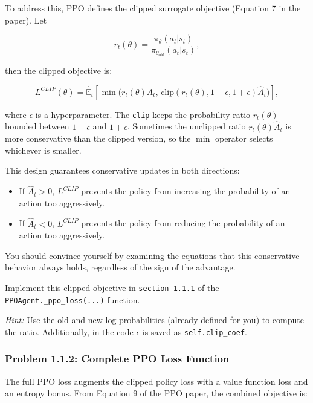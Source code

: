 \documentclass[12pt]{article}
\begin{document}
\noindent
To address this, PPO defines the clipped surrogate objective (Equation 7 in the paper). Let

\begin{equation}
r_t(\theta) = \frac{\pi_\theta(a_t|s_t)}{\pi_{\theta_{\text{old}}}(a_t|s_t)},
\end{equation}

then the clipped objective is:

\begin{equation}
L^{CLIP}(\theta) = \hat{\mathbb{E}}_t \left[ \min\!\Big(r_t(\theta) \hat{A}_t, \, \text{clip}(r_t(\theta), 1-\epsilon, 1+\epsilon) \hat{A}_t\Big) \right],
\end{equation}

where $\epsilon$ is a hyperparameter.  The \texttt{clip} keeps the probability ratio $r_t(\theta)$ bounded between $1-\epsilon$ and $1+\epsilon$. Sometimes the unclipped ratio $r_t(\theta)\hat{A}_t$ is more conservative than the clipped version, so the $\min$ operator selects whichever is smaller.

This design guarantees conservative updates in both directions:
\begin{itemize}
    \item If $\hat{A}_t > 0$, $L^{CLIP}$ prevents the policy from increasing the probability of an action too aggressively.
    \item If $\hat{A}_t < 0$, $L^{CLIP}$ prevents the policy from reducing the probability of an action too aggressively.
\end{itemize}

You should convince yourself by examining the equations that this conservative behavior always holds, regardless of the sign of the advantage.


\noindent
Implement this clipped objective in \texttt{section 1.1.1} of the \texttt{PPOAgent.\_ppo\_loss(...)} function.

\textit{Hint:} Use the old and new log probabilities (already defined for you) to compute the ratio.  Additionally, in the code $\epsilon$ is saved as \texttt{self.clip\_coef}.

\newpage

\subsubsection*{Problem 1.1.2: Complete PPO Loss Function}

The full PPO loss augments the clipped policy loss with a value function loss and an entropy bonus. From Equation 9 of the PPO paper, the combined objective is:
\end{document}
